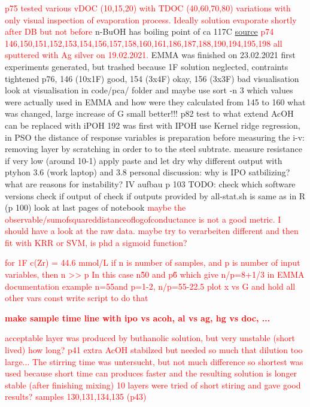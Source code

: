 \documentclass[a4paper]{article}
\newcommand{\todo}[1]{\textbf{\textcolor{red}{#1}}}
\newcommand{\td}[1]{\textcolor{red}{#1}}
\begin{document}
\td{p75 tested various vDOC (10,15,20) with TDOC (40,60,70,80) variations with only visual 
inspection of evaporation process. Ideally solution evaporate shortly after DB but not 
before} 
n-BuOH has boiling point of ca 117C 
\href{https://pubchem.ncbi.nlm.nih.gov/compound/1-butanol#section=Boiling-Point}{source}
\td{p74 146,150,151,152,153,154,156,157,158,160,161,186,187,188,190,194,195,198 
all sputtered with Ag silver on 19.02.2021.}
EMMA was finished on 23.02.2021
first experiments generated, but trashed because 1F solution neglected, contraints 
tightened
p76, 146 (10x1F) good, 154 (3x4F) okay, 156 (3x3F) bad visualisation
look at visualisation in code/pca/ folder and maybe use sort -n 3 
which values were actually used in EMMA and how were they calculated
from 145 to 160 what was changed, large increase of G
small better!!!
p82 test to what extend AcOH can be replaced with iPOH
192 was first with IPOH
use Kernel ridge regression, in PSO the distance of response variables is 
preparation before measuring the i-v: removing layer by scratching in order to to the 
steel subtrate. measure resistance if very low (around 10-1) apply paste and let dry
why different output with ptyhon 3.6 (work laptop) and 3.8 personal
discussion: 
why is IPO satbilizing? 
what are reasons for instability? 
IV aufbau p 103 
TODO: check which software versions
check if output of 
check if outputs provided by all-stat.sh is same as in R  (p 100)
look at last pages of notebook
\td{maybe the observable/sumofsquareddistanceoflogofconductance is not a good metric.
I should have a look at the raw data. maybe try to verarbeiten different and then fit 
with KRR or SVM, is phd a sigmoid function? }

\td{for 1F c(Zr) = 44.6 mmol/L
if n is number of samples, and p is number of input variables, then n >> p 
In this case n\~50 and p\~6 which give n/p=8+1/3
in EMMA documentation example n=55and p=1-2, n/p=55-22.5
plot x vs G and hold all other vars const
write script to do that}

\todo{make sample time line with ipo vs acoh, al vs ag, hg vs doc, ...}

\td{
acceptable layer was produced by buthanolic solution, but very unstable (short lived) how long? p41 
extra AcOH stabilzed but needed so much that dilution too large...
The stirring time was untersucht, but not much difference so shortest was used because 
short time can produces faster and the resulting solution is longer stable 
(after finishing mixing)
10 layers were tried of short stiring and gave good results? samples 130,131,134,135 (p43)
}
\end{document}

